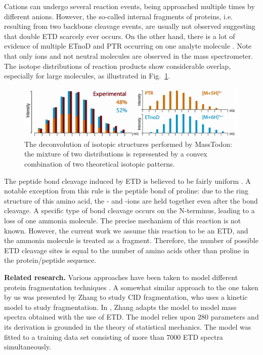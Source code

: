 \documentclass{llncs}
\begin{document}
Cations can undergo several reaction events, being approached multiple times by different anions. However, the so-called internal fragments of proteins, i.e. resulting from two backbone cleavage events, are usually not observed suggesting that double ETD scarcely ever occurs. On the other hand, there is a lot of evidence of multiple ETnoD and PTR occurring on one analyte molecule  \cite{Lermyte2015-li}. Note that only ions and not neutral molecules are observed in the mass spectrometer. The isotope distributions of reaction products show considerable overlap, especially for large molecules, as illustrated in Fig.~\ref{fig::massTodon}.
\begin{figure}[h]\centering
        \includegraphics[width=.8\textwidth]{masstodon.png}
        \caption{The deconvolution of isotopic structures performed by {\sc MassTodon}: the mixture of two distributions is represented by a convex combination of two theoretical isotopic patterns.}\label{fig::massTodon}
\end{figure}


The peptide bond cleavage induced by ETD is believed to be fairly uniform \cite{Li2011-mq}. A notable exception from this rule is the peptide bond of proline: due to the ring structure of this amino acid, the - and -ions are held together even after the  bond cleavage. A specific type of  bond cleavage occurs on the N-terminus, leading to a loss of one ammonia molecule. The precise mechanism of this reaction is not known. However, the current work we assume this reaction to be an ETD, and the ammonia molecule is treated as a  fragment. Therefore, the number of possible ETD cleavage sites is equal to the number of amino acids other than proline in the protein/peptide sequence.

\textbf{Related research.}
Various approaches have been taken to model different protein fragmentation techniques \cite{Breuker2004-az,Simons2010-gy,Zhurov2013-ua,Turecek2013-fq}. A somewhat similar approach to the one taken by us was presented by Zhang \cite{Zhang2004-fp,Zhang2005-jn} to study CID fragmentation, who uses a kinetic model to study fragmentation.
In \cite{Zhang2010-fp}, Zhang adapts the model to model mass spectra obtained with the use of ETD. The model relies upon 280 parameters and its derivation is grounded in the theory of statistical mechanics. The model was fitted to a training data set consisting of more than 7000 ETD spectra simultaneously.
\end{document}
